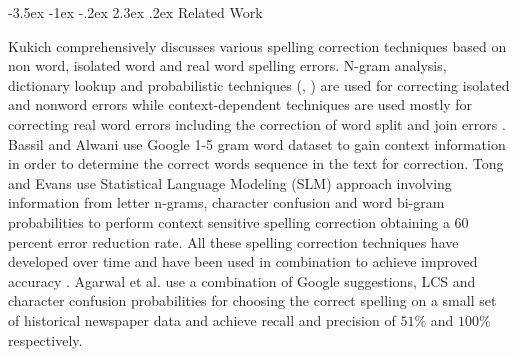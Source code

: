 \documentclass[12pt]{article}
\makeatletter
\renewcommand\section{\@startsection{section}{1}{\z@}%
                                  {-3.5ex \@plus -1ex \@minus -.2ex}%
                                  {2.3ex \@plus.2ex}%
                                  {\normalfont\bfseries}}
\makeatother
\begin{document}
\section{Related Work}
\label{spell:rw}

Kukich\cite{kukich1992techniques} comprehensively discusses various spelling correction techniques based on non word, isolated word and real word spelling errors. N-gram analysis, dictionary lookup and probabilistic techniques (\cite{strohmaier2003lexical}, \cite{ringlstetter2007text}) are used for correcting isolated and nonword errors while context-dependent techniques are used mostly for correcting real word errors including the correction of word split and join errors \cite{elmi1998spelling}.
Bassil and Alwani\cite{bassil2012ocr} use Google 1-5 gram word dataset to gain context information in order to determine the correct words sequence in the text for correction.
Tong and Evans\cite{tong1996statistical} use Statistical Language Modeling (SLM) approach involving information from letter n-grams, character confusion and word bi-gram probabilities to perform context sensitive spelling correction obtaining a 60 percent error reduction rate. All these spelling correction techniques have developed over time and have been used in combination to achieve improved accuracy \cite{brill2000improved}. Agarwal et al.\cite{agarwal2013utilizing} use a combination of Google suggestions, LCS and character confusion probabilities for choosing the correct spelling on a small set of historical newspaper data and achieve recall and precision of $51\%$ and $100\%$ respectively.
\end{document}
